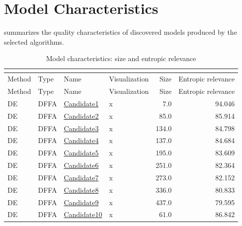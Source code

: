 \documentclass{article}
\begin{document}
\section{Model Characteristics}
\label{sec:model:charaxteristics}
 summarizes the quality characteristics of discovered models produced by the selected algorithms.
\begin{longtable}{llllrr}
\caption{Model characteristics: size and entropic relevance}
\setlength{\tabcolsep}{6pt}
\fontsize{8}{10}\selectfont
\label{tbl:models} \\ 
\toprule
Method & Type & Name & Visualization & Size & Entropic relevance \\ 
\endfirsthead
\midrule
\toprule
Method & Type & Name & Visualization & Size & Entropic relevance \\ 
\midrule
\endhead
DE&DFFA &\href{C:/Users/hootanz/eclipse-workspace/processICPM/20251209_215703/DFFA/DE/candidate1.dffa}{Candidate1} & x &7.0&94.046\\
DE&DFFA &\href{C:/Users/hootanz/eclipse-workspace/processICPM/20251209_215703/DFFA/DE/candidate2.dffa}{Candidate2} & x &85.0&85.914\\
DE&DFFA &\href{C:/Users/hootanz/eclipse-workspace/processICPM/20251209_215703/DFFA/DE/candidate3.dffa}{Candidate3} & x &134.0&84.798\\
DE&DFFA &\href{C:/Users/hootanz/eclipse-workspace/processICPM/20251209_215703/DFFA/DE/candidate4.dffa}{Candidate4} & x &137.0&84.684\\
DE&DFFA &\href{C:/Users/hootanz/eclipse-workspace/processICPM/20251209_215703/DFFA/DE/candidate5.dffa}{Candidate5} & x &195.0&83.609\\
DE&DFFA &\href{C:/Users/hootanz/eclipse-workspace/processICPM/20251209_215703/DFFA/DE/candidate6.dffa}{Candidate6} & x &251.0&82.364\\
DE&DFFA &\href{C:/Users/hootanz/eclipse-workspace/processICPM/20251209_215703/DFFA/DE/candidate7.dffa}{Candidate7} & x &273.0&82.152\\
DE&DFFA &\href{C:/Users/hootanz/eclipse-workspace/processICPM/20251209_215703/DFFA/DE/candidate8.dffa}{Candidate8} & x &336.0&80.833\\
DE&DFFA &\href{C:/Users/hootanz/eclipse-workspace/processICPM/20251209_215703/DFFA/DE/candidate9.dffa}{Candidate9} & x &437.0&79.595\\
DE&DFFA &\href{C:/Users/hootanz/eclipse-workspace/processICPM/20251209_215703/DFFA/DE/candidate10.dffa}{Candidate10} & x &61.0&86.842\\

\end{longtable}
\end{document}

